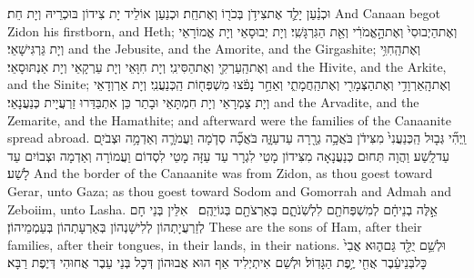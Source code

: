 {וּכְנַ֗עַן יָלַ֛ד אֶת\maqqaf צִידֹ֥ן בְּכֹר֖וֹ וְאֶת\maqqaf חֵֽת׃}
{וּכְנַעַן אוֹלֵיד יָת צִידוֹן בּוּכְרֵיהּ וְיָת חֵת׃}
{And Canaan begot Zidon his firstborn, and Heth;}{}
{וְאֶת\maqqaf הַיְבוּסִי֙ וְאֶת\maqqaf הָ֣אֱמֹרִ֔י וְאֵ֖ת הַגִּרְגָּשִֽׁי׃}
{וְיָת יְבוּסָאֵי וְיָת אֱמוֹרָאֵי וְיָת גַּרְגִּישָׁאֵי׃}
{and the Jebusite, and the Amorite, and the Girgashite;}{}
{וְאֶת\maqqaf הַֽחִוִּ֥י וְאֶת\maqqaf הַֽעַרְקִ֖י וְאֶת\maqqaf הַסִּינִֽי׃}
{וְיָת חִוָּאֵי וְיָת עַרְקָאֵי וְיָת אַנְתּוּסָאֵי׃}
{and the Hivite, and the Arkite, and the Sinite;}{}
{וְאֶת\maqqaf הָֽאַרְוָדִ֥י וְאֶת\maqqaf הַצְּמָרִ֖י וְאֶת\maqqaf הַֽחֲמָתִ֑י וְאַחַ֣ר נָפֹ֔צוּ מִשְׁפְּח֖וֹת הַֽכְּנַעֲנִֽי׃}
{וְיָת אַרְוְדָאֵי וְיָת צַמְרָאֵי וְיָת חִמְתָּאֵי וּבָתַר כֵּן אִתְבַּדַּרוּ זַרְעֲיָית כְּנַעֲנָאֵי׃}
{and the Arvadite, and the Zemarite, and the Hamathite; and afterward were the families of the Canaanite spread abroad.}{}
{וַֽיְהִ֞י גְּב֤וּל הַֽכְּנַעֲנִי֙ מִצִּידֹ֔ן בֹּאֲכָ֥ה גְרָ֖רָה עַד\maqqaf עַזָּ֑ה בֹּאֲכָ֞ה סְדֹ֧מָה וַעֲמֹרָ֛ה וְאַדְמָ֥ה וּצְבֹיִ֖ם עַד\maqqaf לָֽשַׁע׃}
{וַהֲוָה תְּחוּם כְּנַעֲנָאָה מִצִּידוֹן מָטֵי לִגְרָר עַד עַזָּה מָטֵי לִסְדוֹם וַעֲמוֹרָה וְאַדְמָה וּצְבוֹיִם עַד לָשַׁע׃}
{And the border of the Canaanite was from Zidon, as thou goest toward Gerar, unto Gaza; as thou goest toward Sodom and Gomorrah and Admah and Zeboiim, unto Lasha.}{}
{אֵ֣לֶּה בְנֵי\maqqaf חָ֔ם לְמִשְׁפְּחֹתָ֖ם לִלְשֹֽׁנֹתָ֑ם בְּאַרְצֹתָ֖ם בְּגוֹיֵהֶֽם׃ \setuma }
{אִלֵּין בְּנֵי חָם לְזַרְעֲיָתְהוֹן לְלִישָׁנְהוֹן בְּאַרְעָתְהוֹן בְּעַמְמֵיהוֹן׃}
{These are the sons of Ham, after their families, after their tongues, in their lands, in their nations.}{}
{וּלְשֵׁ֥ם יֻלַּ֖ד גַּם\maqqaf ה֑וּא אֲבִי֙ כׇּל\maqqaf בְּנֵי\maqqaf עֵ֔בֶר אֲחִ֖י יֶ֥פֶת הַגָּדֽוֹל׃}
{וּלְשֵׁם אִיתְיְלִיד אַף הוּא אֲבוּהוֹן דְּכָל בְּנֵי עֵבֶר אֲחוּהִי דְּיֶפֶת רַבָּא׃}
